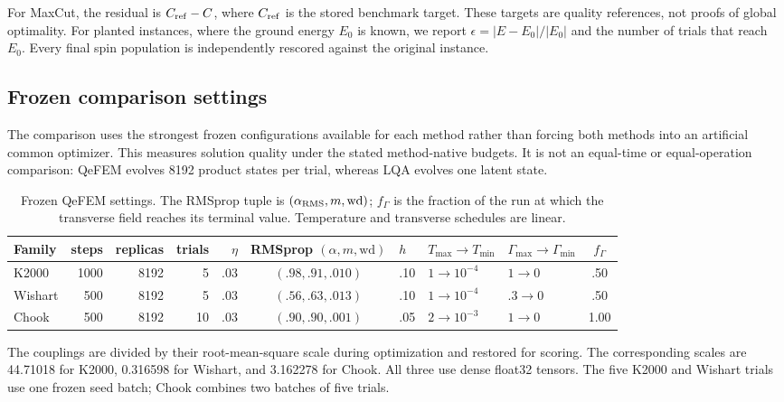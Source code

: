 \documentclass[
  aps,
  prx,
  reprint,
  amsmath,
  amssymb,
  groupedaddress,
  nofootinbib,
  floatfix,
  longbibliography
]{revtex4-2}
\newcommand{\qefem}{QeFEM}
\newcommand{\lqa}{\textsc{LQA}}
\begin{document}
For MaxCut, the residual is $C_{\rm ref}-C$, where $C_{\rm ref}$ is the stored
benchmark target.  These targets are quality references, not proofs of global
optimality.  For planted instances, where the ground energy $E_0$ is known,
we report $\epsilon=|E-E_0|/|E_0|$ and the number of trials that reach $E_0$.
Every final spin population is independently rescored against the original
instance.

\subsection{Frozen comparison settings}

The comparison uses the strongest frozen configurations available for each
method rather than forcing both methods into an artificial common optimizer.
This measures solution quality under the stated method-native budgets.  It is
not an equal-time or equal-operation comparison: \qefem{} evolves 8192 product
states per trial, whereas \lqa{} evolves one latent state.

\begin{table}[t]
\caption{Frozen \qefem{} settings.  The RMSprop tuple is
$(\alpha_{\rm RMS},m,\mathrm{wd})$; $f_\Gamma$ is the fraction of the run at
which the transverse field reaches its terminal value.  Temperature and
transverse schedules are linear.}
\label{tab:qefem-settings}
\centering
\small
\setlength{\tabcolsep}{4.2pt}
\begin{tabular}{lrrrrclllc}
\toprule
Family & steps & replicas & trials & $\eta$ & RMSprop $(\alpha,m,\mathrm{wd})$ & $h$ & $T_{\max}\to T_{\min}$ & $\Gamma_{\max}\to\Gamma_{\min}$ & $f_\Gamma$ \\
\midrule
K2000  & 1000 & 8192 & 5  & .03 & $(.98,.91,.010)$ & .10 & $1\to10^{-4}$ & $1\to0$ & .50 \\
Wishart& 500  & 8192 & 5  & .03 & $(.56,.63,.013)$ & .10 & $1\to10^{-4}$ & $.3\to0$ & .50 \\
Chook  & 500  & 8192 & 10 & .03 & $(.90,.90,.001)$ & .05 & $2\to10^{-3}$ & $1\to0$ & 1.00 \\
\bottomrule
\end{tabular}
\end{table}

The couplings are divided by their root-mean-square scale during optimization
and restored for scoring.  The corresponding scales are 44.71018 for K2000,
0.316598 for Wishart, and 3.162278 for Chook.  All three use dense float32
tensors.  The five K2000 and Wishart trials use one frozen seed batch; Chook
combines two batches of five trials.
\end{document}
